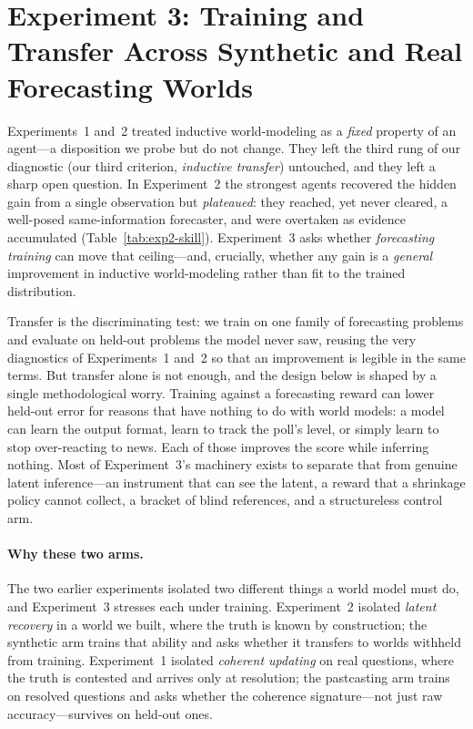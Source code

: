 
\section{Experiment 3: Training and Transfer Across Synthetic and Real Forecasting Worlds}
\label{sec:exp3}

Experiments~1 and~2 treated inductive world-modeling as a \emph{fixed} property of an agent---a
disposition we probe but do not change. They left the third rung of our diagnostic
(our third criterion, \emph{inductive transfer}) untouched, and they left a
sharp open question. In Experiment~2 the strongest agents recovered the hidden gain from a single
observation but \emph{plateaued}: they reached, yet never cleared, a well-posed same-information
forecaster, and were overtaken as evidence accumulated (Table~\ref{tab:exp2-skill}). Experiment~3
asks whether \emph{forecasting training} can move that ceiling---and, crucially, whether any gain is a
\emph{general} improvement in inductive world-modeling rather than fit to the trained distribution.

Transfer is the discriminating test: we train on one family of forecasting problems and evaluate on
held-out problems the model never saw, reusing the very diagnostics of Experiments~1 and~2 so that an
improvement is legible in the same terms. But transfer alone is not enough, and the design below is
shaped by a single methodological worry. Training against a forecasting reward can lower held-out
error for reasons that have nothing to do with world models: a model can learn the output format, learn
to track the poll's level, or simply learn to stop over-reacting to news. Each of those improves the
score while inferring nothing. Most of Experiment~3's machinery exists to separate that from genuine
latent inference---an instrument that can see the latent, a reward that a shrinkage policy cannot
collect, a bracket of blind references, and a structureless control arm.

\paragraph{Why these two arms.}  The two earlier experiments isolated two different things a world model
must do, and Experiment~3 stresses each under training. Experiment~2 isolated \emph{latent recovery} in
a world we built, where the truth is known by construction; the synthetic arm trains that ability and
asks whether it transfers to worlds withheld from training. Experiment~1 isolated \emph{coherent
updating} on real questions, where the truth is contested and arrives only at resolution; the
pastcasting arm trains on resolved questions and asks whether the coherence signature---not just raw
accuracy---survives on held-out ones.

